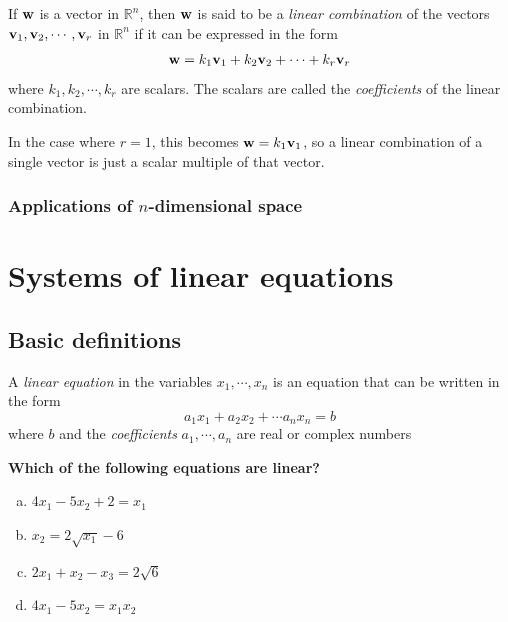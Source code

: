 \documentclass[12pt,letterpaper,reqno]{article}
\numberwithin{equation}{section}
\newcommand{\ti}[1]{\textit{#1}}
\newcommand{\fixme}[1]{{\color{orange}{[#1]}}}
\begin{document}
\begin{defn}
	If ${\bf w}$ is a vector in $\mathbb{R}^n$, then ${\bf w}$ is said to be a \ti{linear combination} of the vectors ${\bf v}_1, {\bf v}_2, \cdots, {\bf v}_r$ in $\mathbb{R}^n$ if it can be expressed in the form
	\begin{align*}
		{\bf w}=k_1{\bf v}_1+k_2{\bf v}_2+\cdots +k_r{\bf v}_r
	\end{align*}
	where $k_1,k_2,\cdots,k_r$ are scalars. The scalars are called the \ti{coefficients} of the linear combination.
	
	In the case where $r=1$, this becomes ${\bf w}=k_1{\bf v}_1$, so a linear combination of a single vector is just a scalar multiple of that vector.
\end{defn}

\subsubsection{Applications of $n$-dimensional space}
\fixme{Finish.}
\section{Systems of linear equations}

\subsection{Basic definitions}
\begin{defn}\label{def:linear_equation}
	A \ti{linear equation} in the variables $x_1,\cdots, x_n$ is an equation that can be written in the form
\begin{equation}
	a_1 x_1+a_2 x_2+\cdots a_n x_n=b
\end{equation}
where $b$ and the \ti{coefficients} $a_1,\cdots, a_n$ are real or complex numbers	
\end{defn}

\begin{exercise}
\bf Which of the following equations are linear?
\begin{enumerate}[(a)]
	\item $4x_1-5x_2+2=x_1$
	\item $x_2=2\sqrt{x_1}-6$
	\item $2x_1+x_2-x_3=2\sqrt{6}$ 
	\item $4x_1-5x_2=x_1x_2$ 
\end{enumerate}
\end{exercise}
\end{document}

